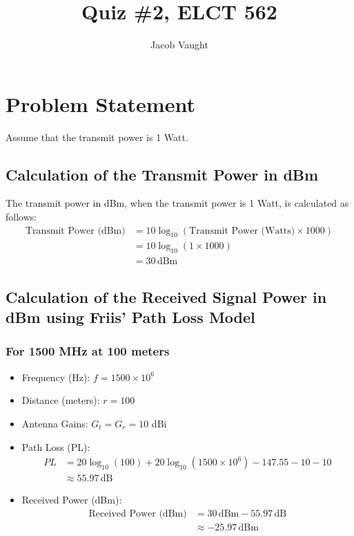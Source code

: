 \documentclass{article}
\title{Quiz \#2, ELCT 562}
\author{Jacob Vaught}
\date{}
\begin{document}
\maketitle

\section{Problem Statement}
Assume that the transmit power is 1 Watt.

\subsection{Calculation of the Transmit Power in dBm}
The transmit power in dBm, when the transmit power is 1 Watt, is calculated as follows:
\begin{align*}
\text{Transmit Power (dBm)} &= 10 \log_{10}(\text{Transmit Power (Watts)} \times 1000) \\
&= 10 \log_{10}(1 \times 1000) \\
&= 30 \, \text{dBm}
\end{align*}

\subsection{Calculation of the Received Signal Power in dBm using Friis' Path Loss Model}
\subsubsection{For 1500 MHz at 100 meters}
\begin{itemize}
\item Frequency (Hz): $f = 1500 \times 10^6$
\item Distance (meters): $r = 100$
\item Antenna Gains: $G_t = G_r = 10$ dBi
\item Path Loss (PL):
\begin{align*}
PL &= 20 \log_{10}(100) + 20 \log_{10}(1500 \times 10^6) - 147.55 - 10 - 10 \\
&\approx 55.97 \, \text{dB}
\end{align*}
\item Received Power (dBm):
\begin{align*}
\text{Received Power (dBm)} &= 30 \, \text{dBm} - 55.97 \, \text{dB} \\
&\approx -25.97 \, \text{dBm}
\end{align*}
\end{itemize}
\end{document}
